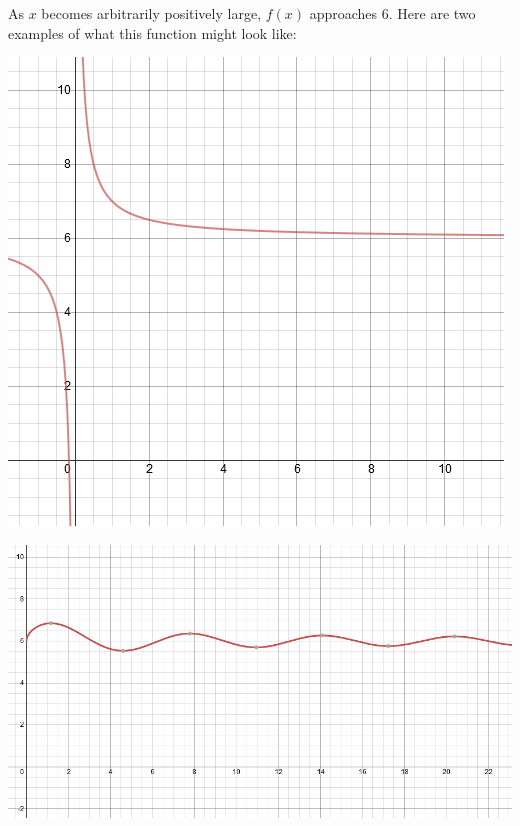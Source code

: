 \documentclass[nooutcomes,handout]{ximera}
\begin{document}
\begin{problem}
	\begin{freeResponse}
	As $x$ becomes arbitrarily positively large, $f(x)$ approaches $6$.  Here are two examples of what this function might look like:
	\begin{image}
	\includegraphics[scale=.5]{figure8.png}
	\end{image}
	\begin{image}
	\includegraphics[scale=.5]{figure9}
	\end{image}
	\end{freeResponse}

\end{problem}
\end{document}
